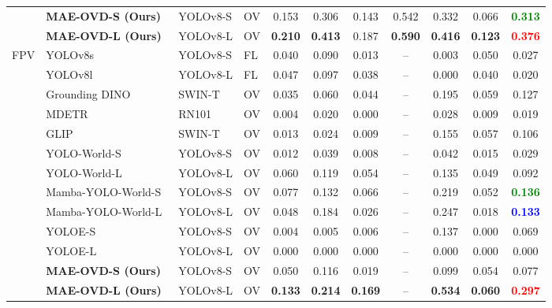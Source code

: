 \documentclass[letterpaper, 10 pt, conference]{ieeeconf}  %
\begin{document}
\begin{table}[!p]
\begin{tabular}{l|lll|cccccc|c}
\rowcolor{gray!15}\cellcolor{white} & \textbf{MAE-OVD-S (Ours)} & YOLOv8-S & OV & 0.153 & 0.306 & 0.143 & 0.542 & 0.332 & 0.066 & \textbf{\textcolor{green}{0.313}} \\
\rowcolor{gray!15}\cellcolor{white} & \textbf{MAE-OVD-L (Ours)} & YOLOv8-L & OV & \textbf{0.210} & \textbf{0.413} & 0.187 & \textbf{0.590} & \textbf{0.416} & \textbf{0.123} & \textbf{\textcolor{red}{0.376}} \\
\hline\hline
\multirow{13}{*}{FPV} & YOLOv8s & YOLOv8-S & FL & 0.040 & 0.090 & 0.013 & -- & 0.003 & 0.050 & 0.027 \\
 & YOLOv8l & YOLOv8-L & FL & 0.047 & 0.097 & 0.038 & -- & 0.000 & 0.040 & 0.020 \\
\cline{2-11}
 & Grounding DINO~\cite{liu2024groundingdino} & SWIN-T & OV & 0.035 & 0.060 & 0.044 & -- & 0.195 & 0.059 & 0.127 \\
 & MDETR~\cite{kamath2021mdetr} & RN101 & OV & 0.004 & 0.020 & 0.000 & -- & 0.028 & 0.009 & 0.019 \\
 & GLIP~\cite{li2022glip} & SWIN-T & OV & 0.013 & 0.024 & 0.009 & -- & 0.155 & 0.057 & 0.106 \\
 & YOLO-World-S~\cite{cheng2024yoloworld} & YOLOv8-S & OV & 0.012 & 0.039 & 0.008 & -- & 0.042 & 0.015 & 0.029 \\
 & YOLO-World-L~\cite{cheng2024yoloworld} & YOLOv8-L & OV & 0.060 & 0.119 & 0.054 & -- & 0.135 & 0.049 & 0.092 \\
 & Mamba-YOLO-World-S~\cite{wang2025mambayoloworld} & YOLOv8-S & OV & 0.077 & 0.132 & 0.066 & -- & 0.219 & 0.052 & \textbf{\textcolor{green}{0.136}} \\
 & Mamba-YOLO-World-L~\cite{wang2025mambayoloworld} & YOLOv8-L & OV & 0.048 & 0.184 & 0.026 & -- & 0.247 & 0.018 & \textbf{\textcolor{blue}{0.133}} \\
 & YOLOE-S~\cite{wang2025yoloe} & YOLOv8-S & OV & 0.004 & 0.005 & 0.006 & -- & 0.137 & 0.000 & 0.069 \\
 & YOLOE-L~\cite{wang2025yoloe} & YOLOv8-L & OV & 0.000 & 0.000 & 0.000 & -- & 0.000 & 0.000 & 0.000 \\
\hhline{~----------}
\rowcolor{gray!15}\cellcolor{white} & \textbf{MAE-OVD-S (Ours)} & YOLOv8-S & OV & 0.050 & 0.116 & 0.019 & -- & 0.099 & 0.054 & 0.077 \\
\rowcolor{gray!15}\cellcolor{white} & \textbf{MAE-OVD-L (Ours)} & YOLOv8-L & OV & \textbf{0.133} & \textbf{0.214} & \textbf{0.169} & -- & \textbf{0.534} & \textbf{0.060} & \textbf{\textcolor{red}{0.297}} \\

\end{tabular}
\end{table}
\end{document}
